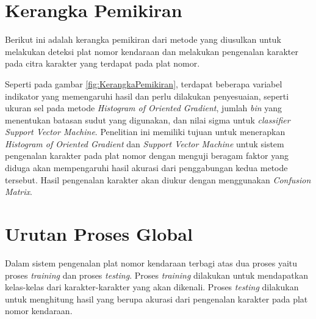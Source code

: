 \section{Kerangka Pemikiran}
\noindent Berikut ini adalah kerangka pemikiran dari metode yang diusulkan untuk melakukan deteksi plat nomor kendaraan dan melakukan pengenalan karakter pada citra karakter yang terdapat pada plat nomor.
\\
\begin{adjustbox}{width=1\textwidth}
	\noindent
	\begin{minipage}{\linewidth}
		\label{fig:KerangkaPemikiran}
	\end{minipage}
\end{adjustbox}

\noindent Seperti pada gambar \ref{fig:KerangkaPemikiran}, terdapat beberapa variabel indikator yang memengaruhi hasil dan perlu dilakukan penyesuaian, seperti ukuran sel pada metode \textit{Histogram of Oriented Gradient}, jumlah \textit{bin} yang menentukan batasan sudut yang digunakan, dan nilai sigma untuk \textit{classifier} \textit{Support Vector Machine}. Penelitian ini memiliki tujuan untuk menerapkan \textit{Histogram of Oriented Gradient} dan \textit{Support Vector Machine} untuk sistem pengenalan karakter pada plat nomor dengan menguji beragam faktor yang diduga akan mempengaruhi hasil akurasi dari penggabungan kedua metode tersebut. Hasil pengenalan karakter akan diukur dengan menggunakan \textit{Confusion Matrix}.\\

\section{Urutan Proses Global}
\noindent Dalam sistem pengenalan plat nomor kendaraan terbagi atas dua proses yaitu proses \textit{training} dan proses \textit{testing}. Proses \textit{training} dilakukan untuk mendapatkan kelas-kelas dari karakter-karakter yang akan dikenali. Proses \textit{testing} dilakukan untuk menghitung hasil yang berupa akurasi dari pengenalan karakter pada plat nomor kendaraan.\\

